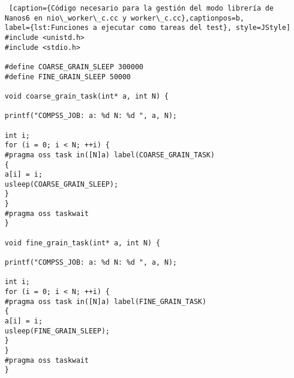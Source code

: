 \begin{lstlisting} [caption={Código necesario para la gestión del modo librería de Nanos6 en nio\_worker\_c.cc y worker\_c.cc},captionpos=b,
label={lst:Funciones a ejecutar como tareas del test}, style=JStyle] 
#include <unistd.h>
#include <stdio.h>

#define COARSE_GRAIN_SLEEP 300000
#define FINE_GRAIN_SLEEP 50000

void coarse_grain_task(int* a, int N) {

printf("COMPSS_JOB: a: %d N: %d ", a, N);

int i;
for (i = 0; i < N; ++i) {
#pragma oss task in([N]a) label(COARSE_GRAIN_TASK) 
{
a[i] = i;
usleep(COARSE_GRAIN_SLEEP);
}
}
#pragma oss taskwait
}

void fine_grain_task(int* a, int N) {

printf("COMPSS_JOB: a: %d N: %d ", a, N);

int i;
for (i = 0; i < N; ++i) {
#pragma oss task in([N]a) label(FINE_GRAIN_TASK)
{
a[i] = i;
usleep(FINE_GRAIN_SLEEP);
}
} 
#pragma oss taskwait
}  
\end{lstlisting}